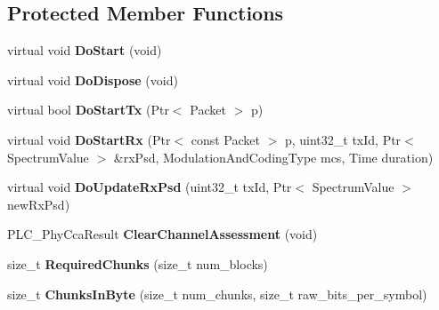 \subsection*{\-Protected \-Member \-Functions}
\begin{DoxyCompactItemize}
\item 
\hypertarget{classns3_1_1PLC__InformationRatePhy_a3bac5d0eeb36cee3bdf9a880be7495e8}{virtual void {\bfseries \-Do\-Start} (void)}\label{classns3_1_1PLC__InformationRatePhy_a3bac5d0eeb36cee3bdf9a880be7495e8}

\item 
\hypertarget{classns3_1_1PLC__InformationRatePhy_a6cb0013270e368139cf710371cf8c9ff}{virtual void {\bfseries \-Do\-Dispose} (void)}\label{classns3_1_1PLC__InformationRatePhy_a6cb0013270e368139cf710371cf8c9ff}

\item 
\hypertarget{classns3_1_1PLC__InformationRatePhy_a1746d2858e9596d44e87e5a5c3dcdd73}{virtual bool {\bfseries \-Do\-Start\-Tx} (\-Ptr$<$ \-Packet $>$ p)}\label{classns3_1_1PLC__InformationRatePhy_a1746d2858e9596d44e87e5a5c3dcdd73}

\item 
\hypertarget{classns3_1_1PLC__InformationRatePhy_a78afcabcd943de4275b9baee0cd6eb74}{virtual void {\bfseries \-Do\-Start\-Rx} (\-Ptr$<$ const \-Packet $>$ p, uint32\-\_\-t tx\-Id, \-Ptr$<$ \-Spectrum\-Value $>$ \&rx\-Psd, \-Modulation\-And\-Coding\-Type mcs, \-Time duration)}\label{classns3_1_1PLC__InformationRatePhy_a78afcabcd943de4275b9baee0cd6eb74}

\item 
\hypertarget{classns3_1_1PLC__InformationRatePhy_a6bc7022d2f5a664d7b0cb422758af210}{virtual void {\bfseries \-Do\-Update\-Rx\-Psd} (uint32\-\_\-t tx\-Id, \-Ptr$<$ \-Spectrum\-Value $>$ new\-Rx\-Psd)}\label{classns3_1_1PLC__InformationRatePhy_a6bc7022d2f5a664d7b0cb422758af210}

\item 
\hypertarget{classns3_1_1PLC__InformationRatePhy_a9bdb8a8081ba19483616f36eca2b8937}{\-P\-L\-C\-\_\-\-Phy\-Cca\-Result {\bfseries \-Clear\-Channel\-Assessment} (void)}\label{classns3_1_1PLC__InformationRatePhy_a9bdb8a8081ba19483616f36eca2b8937}

\item 
\hypertarget{classns3_1_1PLC__InformationRatePhy_ae1a8ca42e425e7970fb01530fa04c9ee}{size\-\_\-t {\bfseries \-Required\-Chunks} (size\-\_\-t num\-\_\-blocks)}\label{classns3_1_1PLC__InformationRatePhy_ae1a8ca42e425e7970fb01530fa04c9ee}

\item 
\hypertarget{classns3_1_1PLC__InformationRatePhy_a6a3a1378c73dbca25892bbb00f715973}{size\-\_\-t {\bfseries \-Chunks\-In\-Byte} (size\-\_\-t num\-\_\-chunks, size\-\_\-t raw\-\_\-bits\-\_\-per\-\_\-symbol)}\label{classns3_1_1PLC__InformationRatePhy_a6a3a1378c73dbca25892bbb00f715973}

\end{DoxyCompactItemize}
